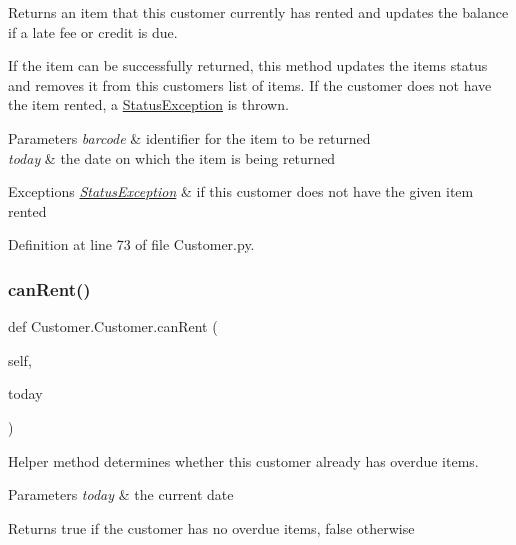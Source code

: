 Returns an item that this customer currently has rented and updates the balance if a late fee or credit is due. 

If the item can be successfully returned, this method updates the item\textquotesingle{}s status and removes it from this customer\textquotesingle{}s list of items. If the customer does not have the item rented, a \hyperlink{namespaceStatusException}{Status\+Exception} is thrown. 
\begin{DoxyParams}{Parameters}
{\em barcode} & identifier for the item to be returned \\
\hline
{\em today} & the date on which the item is being returned \\
\hline
\end{DoxyParams}

\begin{DoxyExceptions}{Exceptions}
{\em \hyperlink{namespaceStatusException}{Status\+Exception}} & if this customer does not have the given item rented \\
\hline
\end{DoxyExceptions}


Definition at line 73 of file Customer.\+py.

\mbox{\label{classCustomer_1_1Customer_ad2f1246cd764010c5701930f6576f5e0}} 
\subsubsection{\texorpdfstring{can\+Rent()}{canRent()}}
{\footnotesize\ttfamily def Customer.\+Customer.\+can\+Rent (\begin{DoxyParamCaption}\item[{}]{self,  }\item[{}]{today }\end{DoxyParamCaption})}



Helper method determines whether this customer already has overdue items. 


\begin{DoxyParams}{Parameters}
{\em today} & the current date \\
\hline
\end{DoxyParams}
\begin{DoxyReturn}{Returns}
true if the customer has no overdue items, false otherwise 
\end{DoxyReturn}


